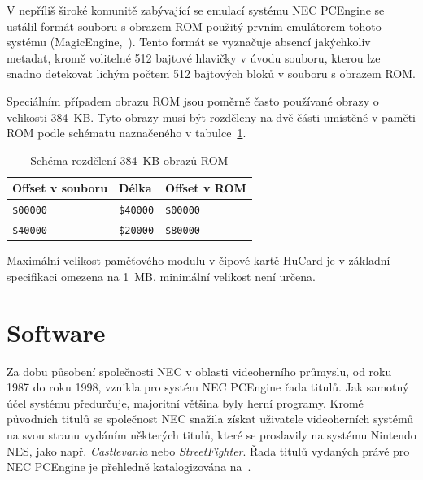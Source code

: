 V nepříliš široké komunitě zabývající se emulací systému NEC PCEngine se
ustálil formát souboru s obrazem ROM použitý prvním emulátorem tohoto systému
(MagicEngine,~\cite{wwwMagicEngine}). Tento formát se vyznačuje absencí
jakýchkoliv metadat, kromě volitelné 512 bajtové hlavičky v úvodu souboru,
kterou lze snadno detekovat lichým počtem 512 bajtových bloků v souboru s
obrazem ROM.

Speciálním případem obrazu ROM jsou poměrně často používané obrazy o velikosti
384~KB. Tyto obrazy musí být rozděleny na dvě části umístěné v paměti ROM podle
schématu naznačeného v tabulce~\ref{tab:rom_split}.

\begin{table}[h!]
\begin{center}
\begin{tabular}{|l|l|l|}
\hline
\textbf{Offset v souboru} & \textbf{Délka} & \textbf{Offset v ROM} \\
\hline
	{\tt \$00000} & {\tt \$40000} & {\tt \$00000} \\
	{\tt \$40000} & {\tt \$20000} & {\tt \$80000} \\
\hline
\end{tabular}
\end{center}
	\caption{Schéma rozdělení 384~KB obrazů ROM\label{tab:rom_split}}
\end{table}

Maximální velikost paměťového modulu v čipové kartě HuCard je v základní
specifikaci omezena na 1~MB, minimální velikost není určena.


\section{Software}\label{chap:spec_sw}

Za dobu působení společnosti NEC v oblasti videoherního průmyslu, od roku 1987
do roku 1998, vznikla pro systém NEC PCEngine řada titulů. Jak samotný účel
systému předurčuje, majoritní většina byly herní programy. Kromě původních
titulů se společnost NEC snažila získat uživatele videoherních systémů na svou
stranu vydáním některých titulů, které se proslavily na systému Nintendo NES,
jako např. {\em Castlevania} nebo {\em StreetFighter}. Řada titulů vydaných
právě pro NEC PCEngine je přehledně katalogizována na~\cite{wwwPceCP}.
